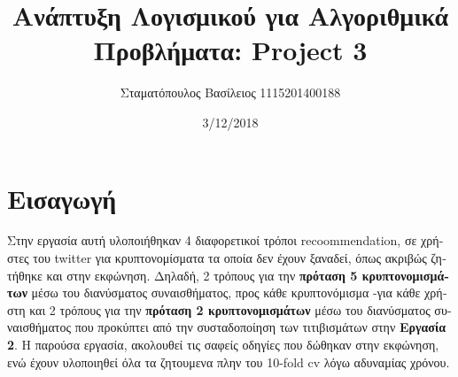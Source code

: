\documentclass{article}
\begin{document}
\title{\textgreek{Ανάπτυξη Λογισμικού για Αλγοριθμικά Προβλήματα:} Project 3}
\author{\textgreek{Σταματόπουλος Βασίλειος } 1115201400188}
\date{3/12/2018}
\maketitle
\section{ \textgreek{Εισαγωγή}}
\textgreek{Στην εργασία αυτή υλοποιήθηκαν 4 διαφορετικοί τρόποι} recoommendation,\textgreek{ σε χρήστες του }twitter \textgreek{ για κρυπτονομίσματα τα οποία δεν έχουν ξαναδεί, όπως ακριβώς ζητήθηκε και στην εκφώνηση. Δηλαδή, 2 τρόπους για την \textbf{πρόταση 5 κρυπτονομισμάτων} μέσω του διανύσματος συναισθήματος, προς κάθε κρυπτονόμισμα -για κάθε χρήστη και 2 τρόπους για την \textbf{πρόταση 2 κρυπτονομισμάτων} μέσω του διανύσματος συναισθήματος που προκύπτει από την συσταδοποίηση των τιτιβισμάτων στην \textbf{Εργασία 2}. Η παρούσα εργασία, ακολουθεί τις σαφείς οδηγίες που δώθηκαν στην εκφώνηση, ενώ έχουν υλοποιηθεί όλα τα ζητουμενα πλην του} 10-fold cv \textgreek {λόγω αδυναμίας χρόνου.}
\end{document}
